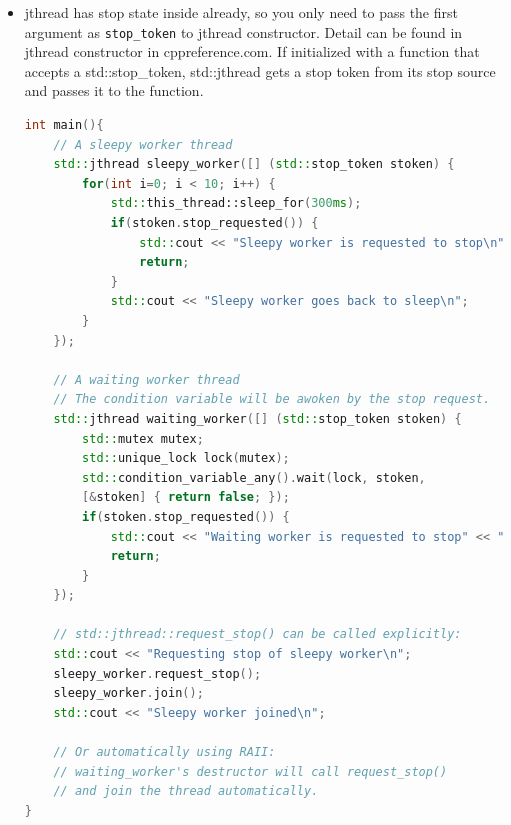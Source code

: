 \documentclass[a4paper,11pt,twoside]{book}
\begin{document}
\begin{itemize}
\begin{lstlisting}[frame=single, language=c++]
void worker_cv_any(std::stop_token stoken) {
	while (true) {
		int jobId = -1;
		
		{ //Locked block
			std::unique_lock lck(mut);
			
			//wait() function takes a stop token and predicate
			// and returns 'predicate()' on signal
			if(!cv_any.wait(lck, stoken, []() {
				return jobs.size() > 0; //Condition to wake
			})) {
				/*Predicate returned false.
				Therefore woke up because of a stop request. */
				break; //Leave
			}
			//Grab jobId
			jobId = jobs.front();
			jobs.pop();
		}
		
		//Do job here outside the lock
		std::cout << std::this_thread::get_id() << " "
		<< "Doing job " << jobId << "\n";
	} //End of while loop
}	
\end{lstlisting}

\item jthread has stop state inside already, so you only need to pass the first argument as \texttt{stop\_token} to jthread constructor.  Detail can be found in jthread constructor in cppreference.com.  If initialized with a function that accepts a std::stop\_token, std::jthread gets a stop token from its stop source and passes it to the function.

\begin{lstlisting}[frame=single, language=c++]
int main(){
	// A sleepy worker thread
	std::jthread sleepy_worker([] (std::stop_token stoken) {
		for(int i=0; i < 10; i++) {
			std::this_thread::sleep_for(300ms);
			if(stoken.stop_requested()) {
				std::cout << "Sleepy worker is requested to stop\n";
				return;
			}
			std::cout << "Sleepy worker goes back to sleep\n";
		}
	});
	
	// A waiting worker thread
	// The condition variable will be awoken by the stop request.
	std::jthread waiting_worker([] (std::stop_token stoken) {
		std::mutex mutex;
		std::unique_lock lock(mutex);
		std::condition_variable_any().wait(lock, stoken,
		[&stoken] { return false; });
		if(stoken.stop_requested()) {
			std::cout << "Waiting worker is requested to stop" << "\n";
			return;
		}
	});
	
	// std::jthread::request_stop() can be called explicitly:
	std::cout << "Requesting stop of sleepy worker\n";
	sleepy_worker.request_stop();
	sleepy_worker.join();
	std::cout << "Sleepy worker joined\n";
	
	// Or automatically using RAII:
	// waiting_worker's destructor will call request_stop()
	// and join the thread automatically.
}
\end{lstlisting}



\end{itemize}
\end{document}
